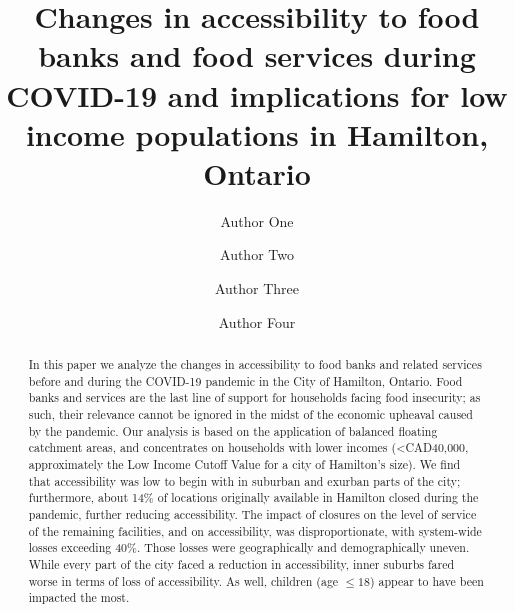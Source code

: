 \documentclass[]{elsarticle} %
\begin{document}
\begin{frontmatter}

  \title{Changes in accessibility to food banks and food services during
COVID-19 and implications for low income populations in Hamilton,
Ontario}
    \author[Some University]{Author One}
    \author[Another University]{Author Two}
    \author[Some University]{Author Three}
    \author[Some University]{Author Four}
      \address[Some University]{Department, Street, City, State, Zip}
    \address[Another University]{Department, Street, City, State, Zip}
  
  \begin{abstract}
  In this paper we analyze the changes in accessibility to food banks
  and related services before and during the COVID-19 pandemic in the
  City of Hamilton, Ontario. Food banks and services are the last line
  of support for households facing food insecurity; as such, their
  relevance cannot be ignored in the midst of the economic upheaval
  caused by the pandemic. Our analysis is based on the application of
  balanced floating catchment areas, and concentrates on households with
  lower incomes (\textless CAD40,000, approximately the Low Income
  Cutoff Value for a city of Hamilton's size). We find that
  accessibility was low to begin with in suburban and exurban parts of
  the city; furthermore, about 14\% of locations originally available in
  Hamilton closed during the pandemic, further reducing accessibility.
  The impact of closures on the level of service of the remaining
  facilities, and on accessibility, was disproportionate, with
  system-wide losses exceeding 40\%. Those losses were geographically
  and demographically uneven. While every part of the city faced a
  reduction in accessibility, inner suburbs fared worse in terms of loss
  of accessibility. As well, children (age \(\le 18\)) appear to have
  been impacted the most.
  \end{abstract}
  
 \end{frontmatter}
\end{document}
